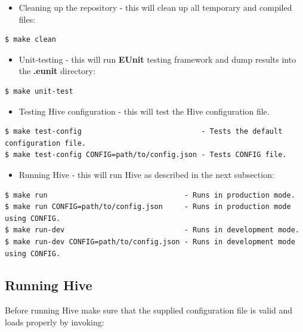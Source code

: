 \documentclass[a4paper]{article}
\begin{document}
\begin{itemize}
\item Cleaning up the repository - this will clean up all temporary and compiled files:
\end{itemize}


\begin{verbatim}
$ make clean
\end{verbatim}




\begin{itemize}
\item Unit-testing - this will run \textbf{EUnit} testing framework and dump results into the \textbf{.eunit} directory:
\end{itemize}


\begin{verbatim}
$ make unit-test
\end{verbatim}




\begin{itemize}
\item Testing Hive configuration - this will test the Hive configuration file.
\end{itemize}


\begin{verbatim}
$ make test-config                            - Tests the default configuration file.
$ make test-config CONFIG=path/to/config.json - Tests CONFIG file.
\end{verbatim}




\begin{itemize}
\item Running Hive - this will run Hive as described in the next subsection:
\end{itemize}


\begin{verbatim}
$ make run                                - Runs in production mode.
$ make run CONFIG=path/to/config.json     - Runs in production mode using CONFIG.
$ make run-dev                            - Runs in development mode.
$ make run-dev CONFIG=path/to/config.json - Runs in development mode using CONFIG.
\end{verbatim}
\subsection{Running Hive}
\label{sec-2-3}

Before running Hive make sure that the supplied configuration file is valid and loads properly by invoking:
\end{document}
